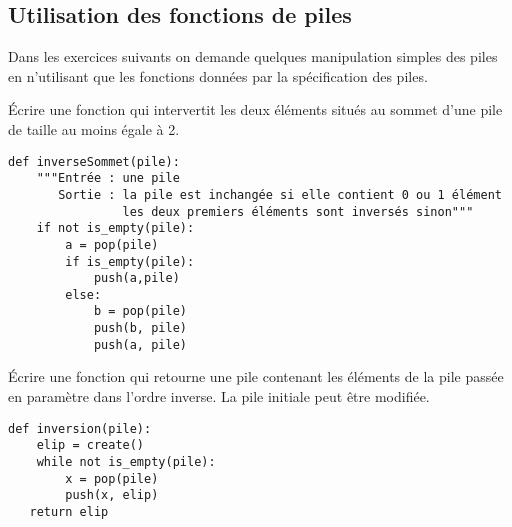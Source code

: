 \subsection{Utilisation des fonctions de piles}
Dans les exercices suivants on demande quelques manipulation simples des piles en n'utilisant que les fonctions données par la spécification des piles.
\begin{Exercise}[title = {Échange des sommets}]\it

Écrire une fonction qui intervertit les deux éléments situés au sommet d'une pile de taille au moins égale à 2.
\end{Exercise} 
\begin{Answer}
\begin{lstlisting}
def inverseSommet(pile):
    """Entrée : une pile
       Sortie : la pile est inchangée si elle contient 0 ou 1 élément
                les deux premiers éléments sont inversés sinon"""
    if not is_empty(pile):
        a = pop(pile)
        if is_empty(pile):
            push(a,pile)
        else:
            b = pop(pile)
            push(b, pile)
            push(a, pile)
\end{lstlisting}
\end{Answer}
\begin{Exercise}[title = {Pile inversée}]\it

Écrire une fonction qui retourne une pile contenant les éléments de la pile passée en paramètre dans l'ordre inverse. La pile initiale peut être modifiée.
\end{Exercise} 
\begin{Answer}
\begin{lstlisting}
def inversion(pile):
    elip = create()
    while not is_empty(pile):
        x = pop(pile)
        push(x, elip)
   return elip
\end{lstlisting}
\end{Answer}
